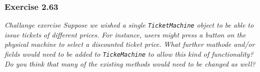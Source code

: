 \subsubsection*{Exercise 2.63}
\textit{Challange exercise Suppose we wished a single \lstinline{TicketMachine} 
object to be able to issue tickets of different prices. For instance, users 
might press a button on the physical machine to select a discounted ticket 
price. What further mathode and/or fields would need to be added to 
\lstinline{TickeMachine} to allow this kind of functionality? Do you think 
that many of the existing methods would need to be changed as well? }

